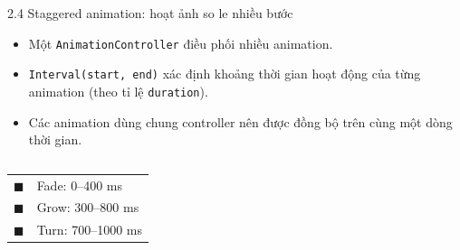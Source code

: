 \documentclass[aspectratio=169,10pt]{beamer}
\begin{document}
\begin{frame}[fragile]{2.4 Staggered animation: hoạt ảnh so le nhiều bước}
  \begin{itemize}
    \item Một \texttt{AnimationController} điều phối nhiều animation.
    \item \texttt{Interval(start, end)} xác định khoảng thời gian
          hoạt động của từng animation (theo tỉ lệ \texttt{duration}).
    \item Các animation dùng chung controller nên được đồng bộ
          trên cùng một dòng thời gian.
  \end{itemize}

  \vspace{0.2cm}

  \begin{columns}[T,onlytextwidth]

    \centering

      \vspace{0.2cm}

      \scriptsize
      \begin{tabular}{ll}
        \textcolor{blue!70!black}{$\blacksquare$} & Fade: 0--400 ms \\
        \textcolor{orange!80!black}{$\blacksquare$} & Grow: 300--800 ms \\
        \textcolor{green!60!black}{$\blacksquare$} & Turn: 700--1000 ms
      \end{tabular}

  \end{columns}
\end{frame}
\end{document}
